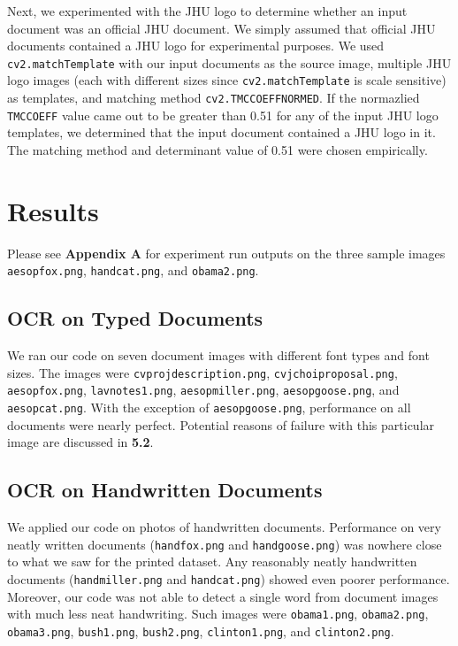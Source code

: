 \documentclass[11pt,letterpaper]{article}
\begin{document}
Next, we experimented with the JHU logo to determine whether an input document was an official JHU document. We simply assumed that official JHU documents contained a JHU logo for experimental purposes. We used {\tt cv2.matchTemplate} with our input documents as the source image, multiple JHU logo images (each with different sizes since {\tt cv2.matchTemplate} is scale sensitive) as templates, and matching method {\tt cv2.TM\textunderscore CCOEFF\textunderscore NORMED}. If the normazlied {\tt TM\textunderscore CCOEFF} value came out to be greater than 0.51 for any of the input JHU logo templates, we determined that the input document contained a JHU logo in it. The matching method and determinant value of 0.51 were chosen empirically.

\section{Results}

Please see \textbf{Appendix A} for experiment run outputs on the three sample images {\tt aesop\textunderscore fox.png}, {\tt hand\textunderscore cat.png}, and {\tt obama2.png}.

\subsection{OCR on Typed Documents}

We ran our code on seven document images with different font types and font sizes. The images were {\tt cv\textunderscore proj\textunderscore description.png}, {\tt cv\textunderscore jchoi\textunderscore proposal.png}, {\tt aesop\textunderscore fox.png}, {\tt lav\textunderscore notes1.png}, {\tt aesop\textunderscore miller.png}, {\tt aesop\textunderscore goose.png}, and {\tt aesop\textunderscore cat.png}. With the exception of {\tt aesop\textunderscore goose.png}, performance on all documents were nearly perfect. Potential reasons of failure with this particular image are discussed in \textbf{5.2}.

\subsection{OCR on Handwritten Documents}

We applied our code on photos of handwritten documents. Performance on very neatly written documents ({\tt hand\textunderscore fox.png} and {\tt hand\textunderscore goose.png}) was nowhere close to what we saw for the printed dataset. Any reasonably neatly handwritten documents ({\tt hand\textunderscore miller.png} and {\tt hand\textunderscore cat.png}) showed even poorer performance.  Moreover, our code was not able to detect a single word from document images with much less neat handwriting. Such images were {\tt obama1.png}, {\tt obama2.png}, {\tt obama3.png}, {\tt bush1.png}, {\tt bush2.png}, {\tt clinton1.png}, and {\tt clinton2.png}.
\end{document}
